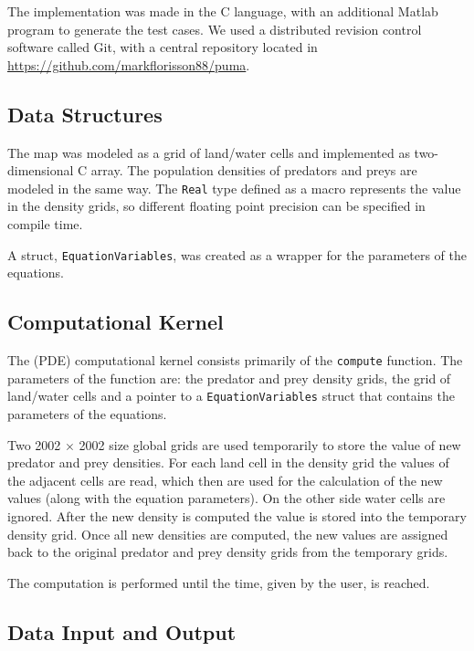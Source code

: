 \documentclass[12pt,a4paper]{article}
\begin{document}
The implementation was made in the C language, with an additional Matlab program to generate the test cases. We used a distributed revision control software called Git, with a central repository located in \url{https://github.com/markflorisson88/puma}.

\subsection{Data Structures}

The map was modeled as a grid of land/water cells and implemented as two-dimensional C array. The population densities of predators and preys are modeled in the same way. The \texttt{Real} type defined as a macro represents the value in the density grids, so different floating point precision  can be specified in compile time. 

A struct, \texttt{EquationVariables}, was created as a wrapper for the parameters of the equations.

\subsection{Computational Kernel}

The (PDE) computational kernel consists primarily of the \texttt{compute} function. The parameters of the function are: the predator and prey density grids, the grid of land/water cells and a pointer to a \texttt{EquationVariables} struct that contains the parameters of the equations.

Two 2002 $\times$ 2002 size global grids are used temporarily to store the value of new predator and prey densities. For each land cell in the density grid the values of the adjacent cells are read, which then are used for the calculation of the new values (along with the equation parameters). On the other side water cells are ignored. After the new density is computed the value is stored into the temporary density grid. Once all new densities are computed, the new values are assigned back to the original predator and prey density grids from the temporary grids.

The computation is performed until the time, given by the user, is reached.


\subsection{Data Input and Output}
\end{document}
